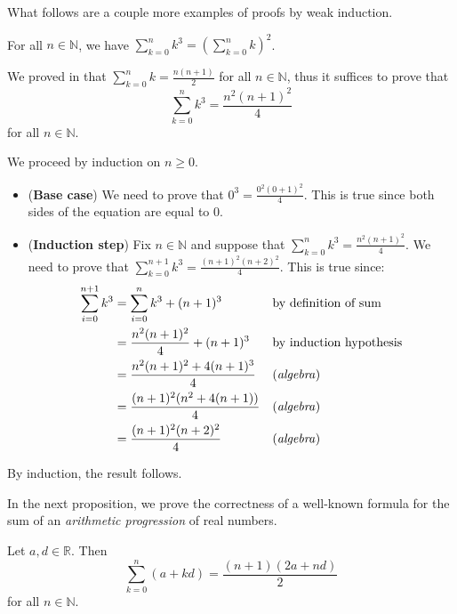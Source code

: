 What follows are a couple more examples of proofs by weak induction.

\begin{proposition}
For all $n \in \mathbb{N}$, we have $\displaystyle \sum_{k=0}^n k^3 = \left( \sum_{k=0}^n k \right)^2$.
\end{proposition}

\begin{cproof}
We proved in  that $\displaystyle\sum_{k=0}^n k = \frac{n(n+1)}{2}$ for all $n \in \mathbb{N}$, thus it suffices to prove that
\[ \sum_{k=0}^n k^3 = \frac{n^2(n+1)^2}{4} \]
for all $n \in \mathbb{N}$.

We proceed by induction on $n \ge 0$.
\begin{itemize}
\item (\textbf{Base case}) We need to prove that $\displaystyle 0^3 = \frac{0^2(0+1)^2}{4}$. This is true since both sides of the equation are equal to $0$.
\item (\textbf{Induction step}) Fix $n \in \mathbb{N}$ and suppose that $\displaystyle \sum_{k=0}^n k^3 = \frac{n^2(n+1)^2}{4}$. We need to prove that $\displaystyle \sum_{k=0}^{n+1} k^3 = \frac{(n+1)^2(n+2)^2}{4}$. This is true since:
\begin{align*}
\sum_{i=0}^{n+1} k^3 & = \sum_{i=0}^n k^3 + (n+1)^3 && \text{by definition of sum} \\
&= \frac{n^2(n+1)^2}{4} + (n+1)^3 && \text{by induction hypothesis} \\
&= \frac{n^2(n+1)^2 + 4(n+1)^3}{4} && \text{(\textit{algebra})} \\
&= \frac{(n+1)^2(n^2 + 4(n+1))}{4} && \text{(\textit{algebra})} \\
&= \frac{(n+1)^2(n+2)^2}{4} && \text{(\textit{algebra})}
\end{align*}
\end{itemize}
By induction, the result follows.
\end{cproof}

In the next proposition, we prove the correctness of a well-known formula for the sum of an \textit{arithmetic progression} of real numbers.

\begin{proposition}
Let $a,d \in \mathbb{R}$. Then
\[ \sum_{k=0}^n (a+kd) = \frac{(n+1)(2a+nd)}{2} \]
for all $n \in \mathbb{N}$.
\end{proposition}

